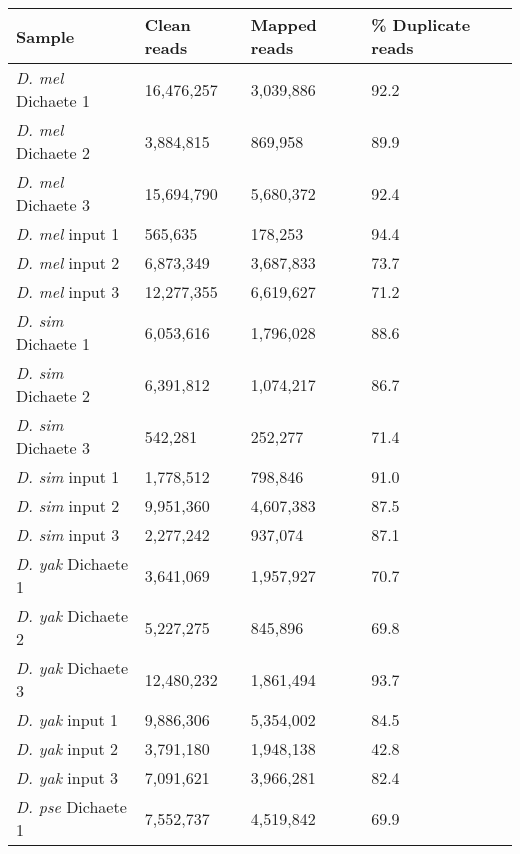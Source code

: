 \begin{table}[h]
\centering
\begin{tabular}{|l|l|l|l|}
\hline
\textbf{Sample}            & \textbf{Clean reads} & \textbf{Mapped reads} & \textbf{\% Duplicate reads} \\ \hline
\emph{D. mel} Dichaete 1 & 16,476,257  & 3,039,886    & 92.2               \\ \hline
\emph{D. mel} Dichaete 2 & 3,884,815   & 869,958      & 89.9               \\ \hline
\emph{D. mel} Dichaete 3 & 15,694,790  & 5,680,372    & 92.4               \\ \hline
\emph{D. mel} input 1    & 565,635     & 178,253      & 94.4               \\ \hline
\emph{D. mel} input 2    & 6,873,349   & 3,687,833    & 73.7               \\ \hline
\emph{D. mel} input 3    & 12,277,355  & 6,619,627    & 71.2               \\ \hline
\emph{D. sim} Dichaete 1 & 6,053,616   & 1,796,028    & 88.6               \\ \hline
\emph{D. sim} Dichaete 2 & 6,391,812   & 1,074,217    & 86.7               \\ \hline
\emph{D. sim} Dichaete 3 & 542,281     & 252,277      & 71.4               \\ \hline
\emph{D. sim} input 1    & 1,778,512   & 798,846      & 91.0                 \\ \hline
\emph{D. sim} input 2    & 9,951,360   & 4,607,383    & 87.5               \\ \hline
\emph{D. sim} input 3    & 2,277,242   & 937,074      & 87.1               \\ \hline
\emph{D. yak} Dichaete 1 & 3,641,069   & 1,957,927    & 70.7               \\ \hline
\emph{D. yak} Dichaete 2 & 5,227,275   & 845,896      & 69.8               \\ \hline
\emph{D. yak} Dichaete 3 & 12,480,232  & 1,861,494    & 93.7               \\ \hline
\emph{D. yak} input 1    & 9,886,306   & 5,354,002    & 84.5               \\ \hline
\emph{D. yak} input 2    & 3,791,180   & 1,948,138    & 42.8               \\ \hline
\emph{D. yak} input 3    & 7,091,621   & 3,966,281    & 82.4               \\ \hline
\emph{D. pse} Dichaete 1 & 7,552,737   & 4,519,842    & 69.9               \\ \hline

\end{tabular}
\end{table}
